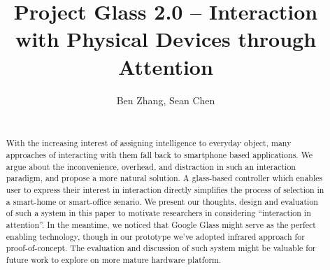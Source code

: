 \documentclass{sigchi}
\begin{document}
\title{Project Glass 2.0 -- Interaction with Physical Devices through Attention}

\author{
{Ben Zhang, Sean Chen}\\
\\
}

\maketitle

\begin{abstract}
With the increasing interest of assigning intelligence to everyday object, many approaches of interacting with them fall back to smartphone based applications. We argue about the inconvenience, overhead, and distraction in such an interaction paradigm, and propose a more natural solution. A glass-based controller which enables user to express their interest in interaction directly simplifies the process of selection in a smart-home or smart-office senario. We present our thoughts, design and evaluation of such a system in this paper to motivate researchers in considering ``interaction in attention''. In the meantime, we noticed that Google Glass might serve as the perfect enabling technology, though in our prototype we've adopted infrared approach for proof-of-concept. The evaluation and discussion of such system might be valuable for future work to explore on more mature hardware platform.
\end{abstract}















\end{document}
